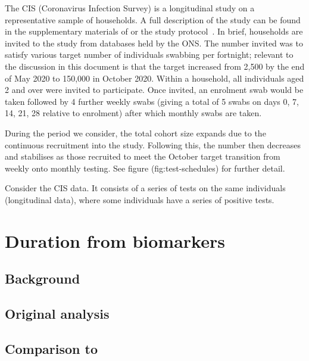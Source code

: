 \documentclass{cam-thesis}
\makeatletter
\DeclareRobustCommand\onedot{\futurelet\@let@token\@onedot}
\def\@onedot{\ifx\@let@token.\else.\null\fi\xspace}
\def\etal{et al\onedot}
\makeatother
\begin{document}
The CIS (Coronavirus Infection Survey) is a longitudinal study on a representative sample of households.
A full description of the study can be found in the supplementary materials of \textcite{pouwelsCommunity} or the study protocol~\autocite{cisProtocol}.
In brief, households are invited to the study from databases held by the ONS.
The number invited was to satisfy various target number of individuals swabbing per fortnight; relevant to the discussion in this document is that the target increased from 2,500 by the end of May 2020 to 150,000 in October 2020.
Within a household, all individuals aged 2 and over were invited to participate.
Once invited, an enrolment swab would be taken followed by 4 further weekly swabs (giving a total of 5 swabs on days 0, 7, 14, 21, 28 relative to enrolment) after which monthly swabs are taken.

During the period we consider, the total cohort size expands due to the continuous recruitment into the study.
Following this, the number then decreases and stabilises as those recruited to meet the October target transition from weekly onto monthly testing.
See figure \@ref(fig:test-schedules) for further detail.


Consider the CIS data.
It consists of a series of tests on the same individuals (longitudinal data), where some individuals have a series of positive tests.

\chapter{Duration from biomarkers} \label{ATACCC}

\section{Background}

\section{Original analysis}

\section{Comparison to \texorpdfstring{\textcite{hakkiOnset}}{Hakki \etal (2022)}}
\end{document}
